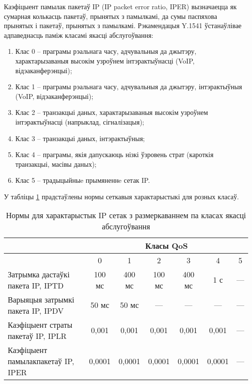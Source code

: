 Каэфіцыент памылак пакетаў IP (IP packet error ratio, IPER) вызначаецца як сумарная колькасць пакетаў, прынятых з памылкамі, да сумы паспяхова прынятых і пакетаў, прынятых з памылкамі.
Рэкамендацыя Y.1541 ўстанаўлівае адпаведнасць паміж класамі якасці абслугоўвання:
\begin{enumerate}
    \item Клас 0 -- праграмы рэальнага часу, адчувальныя да джытэру, характарызаваныя высокім узроўнем інтэрактыўнасці (VoIP, відэаканферэнцыі);
    \item Клас 1 -- праграмы рэальнага часу, адчувальныя да джытэру, інтэрактыўныя (VoIP, відэаканферэнцыі);
    \item Клас 2 -- транзакцыі даных, характарызаваныя высокім узроўнем інтэрактыўнасці (напрыклад, сігналізацыя);
    \item Клас 3 -- транзакцыі даных, інтэрактыўныя;
    \item Клас 4 -- праграмы, якія дапускаюць нізкі ўзровень страт (кароткія транзакцыі, масівы даных);
    \item Клас 5 -- традыцыйныe прымяненнe сетак IP.
\end{enumerate}

\newpage

У табліцы \ref{table: Class Charactaristics} прадстаўлены нормы сеткавыя характарыстыкі для розных класаў.

\begin{table}[h!]
    \caption{Нормы для характарыстык IP сетак з
             размеркаваннем па класах якасці абслугоўвання}
    \begin{tabularx}{\textwidth}{|>{\centering\arraybackslash}X|
                                 c|c|c|c|c|c|}
        \hline
        \multirow{2}{*}{Сеткавыя характарыстыкі} & \multicolumn{6}{c|}{Класы QoS} \\
        \cline{2-7}
                  & 0 & 1 & 2 & 3 & 4 & 5 \\
        \hline
        Затрымка дастаўкі пакета IP, IPTD & 100 мс & 400 мс & 100 мс & 400 мс & 1 с & ---  \\
        \hline
        Варыяцыя затрымкі пакета IP, IPDV & 50 мс & 50 мс & --- & --- & --- & --- \\
        \hline
        Каэфіцыент страты пакетаў IP, IPLR & 0,001 & 0,001 & 0,001 & 0,001 & 0,001 & --- \\
        \hline
        Каэфіцыент памылакпакетаў IP, IPER & 0,0001 & 0,0001 & 0,0001 & 0,0001 & 0,0001 & --- \\
        \hline
    \end{tabularx}
    \label{table: Class Charactaristics}
\end{table}


